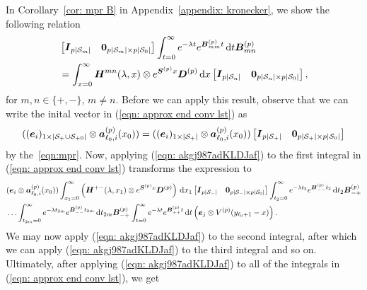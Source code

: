 In Corollary~\ref{cor: mpr B} in Appendix~\ref{appendix: kronecker}, we show the following relation
\begin{align}
	&\vligne{\bs I_{p|\calS_m|} & \bs 0_{p|\calS_m|\times p|\calS_0|} }\int_{t=0}^\infty e^{-\lambda t} e^{\bs{B}^{(p)}_{mm}t} \wrt t \bs{B}^{(p)}_{m{n}} \nonumber %
	\\&= \int_{x=0}^\infty \bs H^{mn}(\lambda,x)  \otimes  e^{\bs S^{(p)} x}\bs D^{(p)}\wrt x \vligne{\bs I_{p|\calS_n|} & \bs 0_{p|\calS_n|\times p|\calS_0|}}, \label{eqn: akgj987adKLDJaf}
\end{align}
for \(m,n\in\{+,-\}\), \(m\neq n\). Before we can apply this result, observe that we can write the inital vector in (\ref{eqn: approx end conv lst}) as 
\[((\boldsymbol e_i)_{1\times |\mathcal{S}_+\cup\mathcal{S}_{+0}|}\otimes \boldsymbol  a_{\ell_0,i}^{(p)}(x_0)) = ((\boldsymbol e_i)_{1\times |\mathcal{S}_+|}\otimes \boldsymbol  a_{\ell_0,i}^{(p)}(x_0))\begin{bmatrix} \boldsymbol I_{p|\mathcal{S}_+|} & \boldsymbol 0_{p|\mathcal{S}_+|\times p|\mathcal{S}_0|} \end{bmatrix}\]
by the~\ref{eqn:mpr}. 
Now, applying (\ref{eqn: akgj987adKLDJaf}) to the first integral in (\ref{eqn: approx end conv lst}) transforms the expression to 
\begin{align}
	&(\boldsymbol e_i\otimes \boldsymbol  a_{\ell_0,i}^{(p)}(x_0)) \int_{x_1=0}^\infty \left(\boldsymbol H^{+{-}}(\lambda,x_1) \otimes e^{\boldsymbol S^{(p)} x}\boldsymbol D^{(p)}\right) \, \mathrm{d} x_1 \begin{bmatrix} \boldsymbol I_{p|\mathcal{S}_-|} & \boldsymbol 0_{p|\mathcal{S}_-|\times p|\mathcal{S}_0|} \end{bmatrix} \nonumber
	\int_{t_2=0}^\infty e^{-\lambda t_2} e^{\boldsymbol{B}^{(p)}_{--}t_2} \, \mathrm{d} t_2\boldsymbol{B}^{(p)}_{-{+}} 
	\\&\hdots 
	\int_{t_{2m}=0}^\infty e^{-\lambda t_{2m}}e^{\boldsymbol{B}^{(p)}_{--}t_{2m}} \, \mathrm{d} t_{2m}\boldsymbol{B}^{(p)}_{-{+}} 
	\int_{t=0}^\infty e^{-\lambda t}e^{\boldsymbol{B}^{(p)}_{++}t} \, \mathrm{d} t 
	\left(\boldsymbol e_j \otimes V^{(p)}(y_{\ell_0+1}-x)\right). \label{eqn: approx end conv lst2}
\end{align}
We may now apply (\ref{eqn: akgj987adKLDJaf}) to the second integral, after which we can apply (\ref{eqn: akgj987adKLDJaf}) to the third integral and so on. Ultimately, after applying (\ref{eqn: akgj987adKLDJaf}) to all of the integrals in (\ref{eqn: approx end conv lst}), we get 
